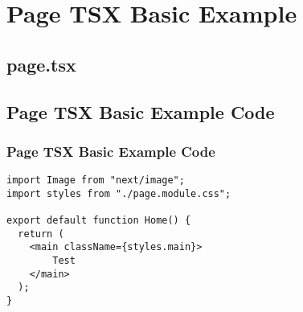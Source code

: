 \documentclass{beamer}
\begin{document}
\section{Page TSX Basic Example}
\subsection{page.tsx}

\begin{frame}[fragile]
\subsection{Page TSX Basic Example Code}
\frametitle{Page TSX Basic Example Code}
\begin{lstlisting}
import Image from "next/image";
import styles from "./page.module.css";

export default function Home() {
  return (
    <main className={styles.main}>
        Test
    </main>
  );
}
\end{lstlisting}
\end{frame}
\end{document}

